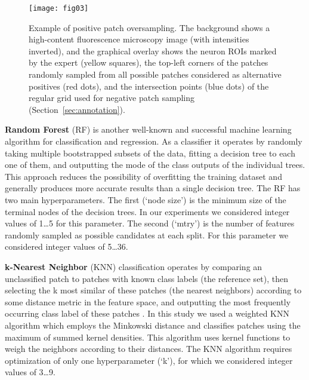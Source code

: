 \begin{figure}[!t]
\centering
\texttt{[image: fig03]}
\caption{Example of positive patch oversampling. The background shows a high-content fluorescence microscopy image (with intensities inverted), and the graphical overlay shows the neuron ROIs marked by the expert (yellow squares), the top-left corners of the patches randomly sampled from all possible patches considered as alternative positives (red dots), and the intersection points (blue dots) of the regular grid used for negative patch sampling (Section~\ref{sec:annotation}).}
\label{fig:oversampling}
\end{figure}

\bigskip

{\bf Random Forest} (RF) is another well-known and successful machine learning algorithm \citep{Breiman2001} for classification and regression. As a classifier it operates by randomly taking multiple bootstrapped subsets of the data, fitting a decision tree to each one of them, and outputting the mode of the class outputs of the individual trees. This approach reduces the possibility of overfitting the training dataset and generally produces more accurate results than a single decision tree. The RF has two main hyperparameters. The first (`node size') is the minimum size of the terminal nodes of the decision trees. In our experiments we considered integer values of 1\dots5 for this parameter. The second (`mtry') is the number of features randomly sampled as possible candidates at each split. For this parameter we considered integer values of 5\dots36.

\bigskip

{\bf k-Nearest Neighbor} (KNN) classification operates by comparing an unclassified patch to patches with known class labels (the reference set), then selecting the k most similar of these patches (the nearest neighbors) according to some distance metric in the feature space, and outputting the most frequently occurring class label of these patches \citep{1053964}. In this study we used a weighted KNN algorithm \citep{Hechenbichler06weightedk-nearest-neighbor, citeulike:13121917} which employs the Minkowski distance and classifies patches using the maximum of summed kernel densities. This algorithm uses kernel functions to weigh the neighbors according to their distances. The KNN algorithm requires optimization of only one hyperparameter (`k'), for which we considered integer values of 3\dots9.

\bigskip

